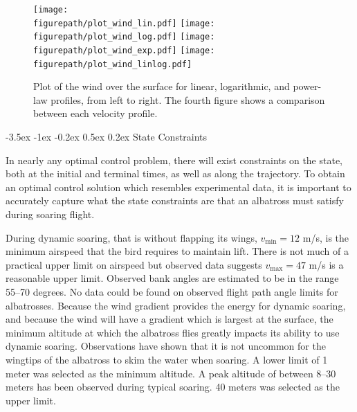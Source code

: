 \documentclass[11pt,letterpaper,onecolumn]{article}
\makeatletter
\newcommand{\figurepath}{../fig/term-project}
\renewcommand\subsection{\@startsection{subsection}{1}{\z@}%
 {-3.5ex \@plus-1ex \@minus-0.2ex}%
 {0.5ex \@plus0.2ex}%
 {\fontsize{10pt}{10pt}\selectfont\bfseries\sffamily}}
\makeatother
\begin{document}
\begin{figure}[h]
  \begin{center}
    \texttt{[image: \\figurepath/plot\_wind\_lin.pdf]}
    \texttt{[image: \\figurepath/plot\_wind\_log.pdf]}
    \texttt{[image: \\figurepath/plot\_wind\_exp.pdf]}
    \texttt{[image: \\figurepath/plot\_wind\_linlog.pdf]}
    \caption{Plot of the wind over the surface for linear, logarithmic, and power-law profiles, from left to right. The fourth figure shows a comparison between each velocity profile.\label{fig.windplot}}
  \end{center}
\end{figure}

\subsection{State Constraints}\label{subsec.stateconstraints}

In nearly any optimal control problem, there will exist constraints on the state, both at the initial and terminal times, as well as along the trajectory.
To obtain an optimal control solution which resembles experimental data, it is important to accurately capture what the state constraints are that an albatross must satisfy during soaring flight.

During dynamic soaring, that is without flapping its wings, $v_{\text{min}}=12$ m/s, is the minimum airspeed that the bird requires to maintain lift\cite{wilson.sweeping.1975,videler.avianflightbook.2005}.
There is not much of a practical upper limit on airspeed\cite{catry.sustainedfast.2004} but observed data suggests $v_{\text{max}}=47$ m/s is a reasonable upper limit.
Observed bank angles are estimated to be in the range 55--70 degrees.\cite{idrac.experimentelle.1932,pennycuick.gust.2002} No data could be found on observed flight path angle limits for albatrosses.
Because the wind gradient provides the energy for dynamic soaring, and because the wind will have a gradient which is largest at the surface, the minimum altitude at which the albatross flies greatly impacts its ability to use dynamic soaring.
Observations have shown that it is not uncommon for the wingtips of the albatross to skim the water when soaring.
A lower limit of 1 meter was selected as the minimum altitude.
A peak altitude of between 8--30 meters has been observed during typical soaring.
40 meters was selected as the upper limit.
\end{document}
